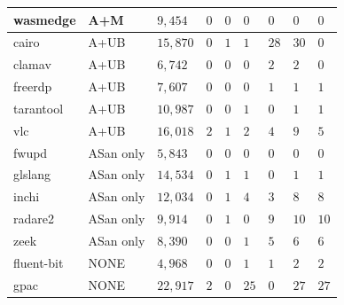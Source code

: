 \begin{adjustbox}{width=\textwidth,center}
\begin{tabular}{|l|l|l|l|l|l|l|l|l|}
wasmedge         & A+M                 & $9,454$             & $0$              & $0$           & $0$           & $0$            & $0$             & $0$                 \\ 
\hline
cairo            & A+UB                & $15,870$            & $0$              & $1$           & $1$           & $28$           & $30$            & $0$                 \\
clamav           & A+UB                & $6,742$             & $0$              & $0$           & $0$           & $2$            & $2$             & $0$                 \\
freerdp          & A+UB                & $7,607$             & $0$              & $0$           & $0$           & $1$            & $1$             & $1$                 \\
tarantool        & A+UB                & $10,987$            & $0$              & $0$           & $1$           & $0$            & $1$             & $1$                 \\
vlc              & A+UB                & $16,018$            & $2$              & $1$           & $2$           & $4$            & $9$             & $5$                 \\ 
\hline
fwupd            & ASan only                & $5,843$             & $0$              & $0$           & $0$           & $0$            & $0$             & $0$                 \\
glslang          & ASan only                & $14,534$            & $0$              & $1$           & $1$           & $0$            & $1$             & $1$                 \\
inchi            & ASan only                & $12,034$            & $0$              & $1$           & $4$           & $3$            & $8$             & $8$                 \\
radare2          & ASan only                & $9,914$             & $0$              & $1$           & $0$           & $9$            & $10$            & $10$                \\
zeek             & ASan only                & $8,390$             & $0$              & $0$           & $1$           & $5$            & $6$             & $6$                 \\ 
\hline
fluent-bit       & NONE                & $4,968$             & $0$              & $0$           & $1$           & $1$            & $2$             & $2$                 \\
gpac             & NONE                & $22,917$            & $2$         & $0$           & $25$          & $0$            & $27$            & $27$                \\

\end{tabular}
\end{adjustbox}
